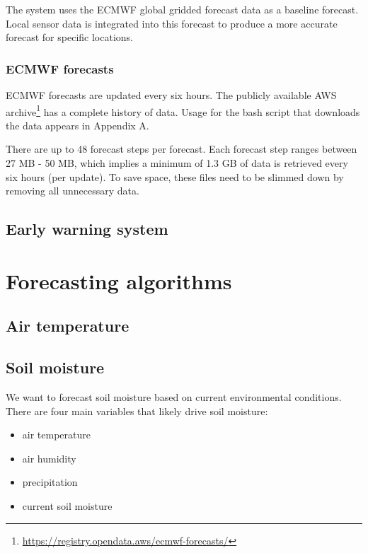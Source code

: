 \documentclass[
]{book}
\providecommand{\tightlist}{%
  \setlength{\itemsep}{0pt}\setlength{\parskip}{0pt}}
\begin{document}
The system uses the ECMWF global gridded forecast data as a baseline forecast.
Local sensor data is integrated into this forecast to produce a more
accurate forecast for specific locations.

\hypertarget{ecmwf-forecasts}{%
\subsection{ECMWF forecasts}\label{ecmwf-forecasts}}

ECMWF forecasts are updated every six hours. The publicly available AWS
archive\footnote{\url{https://registry.opendata.aws/ecmwf-forecasts/}}
has a complete history of data.
Usage for the bash script that downloads the data appears in Appendix A.

There are up to 48 forecast steps per forecast.
Each forecast step ranges between 27 MB - 50 MB,
which implies a minimum of 1.3 GB of data is
retrieved every six hours (per update).
To save space, these files need to be slimmed down
by removing all unnecessary data.

\hypertarget{early-warning-system}{%
\section{Early warning system}\label{early-warning-system}}

\hypertarget{forecasting-algorithms}{%
\chapter{Forecasting algorithms}\label{forecasting-algorithms}}

\hypertarget{air-temperature}{%
\section{Air temperature}\label{air-temperature}}

\hypertarget{soil-moisture}{%
\section{Soil moisture}\label{soil-moisture}}

We want to forecast soil moisture based on current environmental conditions. There are four main variables that likely drive soil moisture:

\begin{itemize}
\tightlist
\item
  air temperature
\item
  air humidity
\item
  precipitation
\item
  current soil moisture
\end{itemize}
\end{document}
